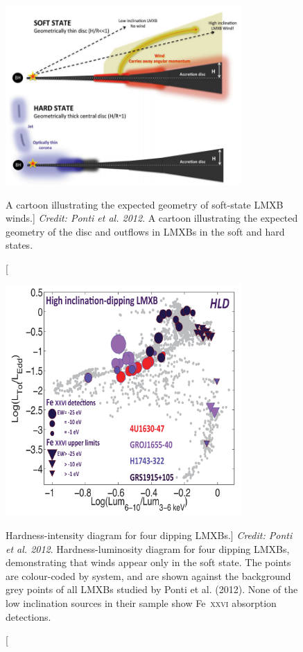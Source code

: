\begin{figure}
\centering
\includegraphics[width=0.8\textwidth]{figures/01-intro/ponti_wind_cartoon.png}
\caption
[A cartoon illustrating the expected geometry of soft-state LMXB winds.]
{
{\sl Credit: Ponti et al. 2012}. 
A cartoon illustrating the expected geometry of the disc and outflows in
LMXBs in the soft and hard states.
} 
\label{fig:ponti_cartoon}
\end{figure}


\begin{figure}
\centering
\includegraphics[width=0.8\textwidth]{figures/02-outflows/ponti_hid_dip.png}
\caption
[Hardness-intensity diagram for four dipping LMXBs.]
{
{\sl Credit: Ponti et al. 2012}. 
Hardness-luminosity diagram for four dipping LMXBs,
demonstrating that winds appear only in the soft state. 
The points are colour-coded by system, and are shown against the 
background grey points of all LMXBs studied by Ponti et al. (2012).
None of the low inclination sources in their sample show Fe~\textsc{xxvi}
absorption detections.
} 
\label{fig:ponti_hid}
\end{figure}


